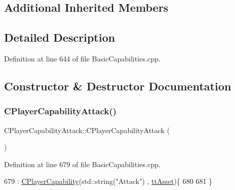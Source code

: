\subsection*{Additional Inherited Members}


\subsection{Detailed Description}


Definition at line 644 of file Basic\+Capabilities.\+cpp.



\subsection{Constructor \& Destructor Documentation}
\hypertarget{classCPlayerCapabilityAttack_ae9430ec5ce80a461030603c5cab0525c}{}\label{classCPlayerCapabilityAttack_ae9430ec5ce80a461030603c5cab0525c} 
\subsubsection{\texorpdfstring{C\+Player\+Capability\+Attack()}{CPlayerCapabilityAttack()}}
{\footnotesize\ttfamily C\+Player\+Capability\+Attack\+::\+C\+Player\+Capability\+Attack (\begin{DoxyParamCaption}{ }\end{DoxyParamCaption})\hspace{0.3cm}{\ttfamily [protected]}}



Definition at line 679 of file Basic\+Capabilities.\+cpp.


\begin{DoxyCode}
679                                                  : \hyperlink{classCPlayerCapability_a303de62aba5d3f65d9a8e013c64a96c1}{CPlayerCapability}(std::string(\textcolor{stringliteral}{"Attack"})
      , \hyperlink{classCPlayerCapability_a9d3450ed1532fd536bd6cbb1e2eef02facb6ee2a28b5d50b9d3009c272f2881aa}{ttAsset})\{
680 
681 \}
\end{DoxyCode}
\hypertarget{classCPlayerCapabilityAttack_ac18875f6e891a2e8b805ed42bb001bb3}{}\label{classCPlayerCapabilityAttack_ac18875f6e891a2e8b805ed42bb001bb3} 
